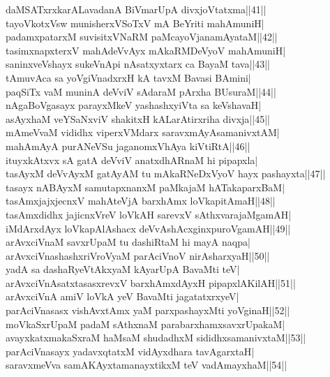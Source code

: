 \documentclass{article}
\begin{document}
daMSATxrxkarALavadanA BiVmarUpA divxjoVtatxma||41||\\
tayoVkotxVsw munisherxVSoTxV mA BeYriti mahAmuniH|\\
padamxpatarxM suvisitxVNaRM paMcayoVjanamAyataM||42||\\
tasimxnapxterxV mahAdeVvAyx mAkaRMDeVyoV mahAmuniH|\\
saninxveVshayx sukeVnApi nAsatxyxtarx ca BayaM tava||43||\\
tAmuvAca sa yoVgiVnadxrxH kA tavxM Bavasi BAmini|\\
paqSiTx vaM muninA deVviV sAdaraM pArxha BUsuraM||44||\\
nAgaBoVgasayx parayxMkeV yashashxyiVta sa keVshavaH|\\
asAyxhaM veYSaNxviV shakitxH kALarAtirxriha divxja||45||\\
mAmeVvaM vididhx viperxVMdarx saravxmAyAsamanivxtAM|\\
mahAmAyA purANeVSu jaganomxVhAya kiVtiRtA||46||\\
ituyxkAtxvx sA gatA deVviV anatxdhARnaM hi pipapxla|\\
tasAyxM deVvAyxM gatAyAM tu mAkaRNeDxVyoV hayx pashayxta||47||\\
tasayx nABAyxM samutapxnanxM paMkajaM hATakaparxBaM|\\
tasAmxjajxjecnxV mahAteVjA barxhAmx loVkapitAmaH||48||\\
tasAmxdidhx jajicnxVreV loVkAH sarevxV sAthxvarajaMgamAH|\\
iMdArxdAyx loVkapAlAshacx deVvAshAcxginxpuroVgamAH||49||\\
arAvxciVnaM savxrUpaM tu dashiRtaM hi mayA naqpa|\\
arAvxciVnashashxriVroVyaM parAciVnoV nirAsharxyaH||50||\\
yadA sa dashaRyeVtAkxyaM kAyarUpA BavaMti teV|\\
arAvxciVnAsatxtasasxrevxV barxhAmxdAyxH pipapxlAKilAH||51||\\
arAvxciVnA amiV loVkA yeV BavaMti jagatatxrxyeV|\\
parAciVnasasx vishAvxtAmx yaM parxpashayxMti yoVginaH||52||\\
moVkaSxrUpaM padaM sAthxnaM parabarxhamxsavxrUpakaM|\\
avayxkatxmakaSxraM haMsaM shudadhxM sididhxsamanivxtaM||53||\\
parAciVnasayx yadavxqtatxM vidAyxdhara tavAgarxtaH|\\
saravxmeVva samAKAyxtamanayxtikxM teV vadAmayxhaM||54||\\
\end{document}
